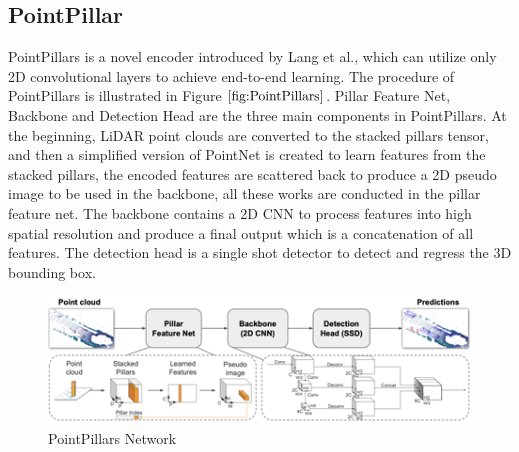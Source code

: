 \subsection{PointPillar}
PointPillars is a novel encoder introduced by Lang et al.\cite{lang_pointpillars_2019}, which can utilize only 2D convolutional layers to achieve end-to-end learning. The procedure of PointPillars is illustrated in Figure \(\ref{fig:PointPillars}\). Pillar Feature Net, Backbone and Detection Head are the three main components in PointPillars. At the beginning, LiDAR point clouds are converted to the stacked pillars tensor, and then a simplified version of PointNet\cite{qi_pointnet_2017} is created to learn features from the stacked pillars, the encoded features are scattered back to produce a 2D pseudo image to be used in the backbone, all these works are conducted in the pillar feature net. The backbone contains a 2D CNN to process features into high spatial resolution and produce a final output which is a concatenation of all features. The detection head is a single shot detector to detect and regress the 3D bounding box.
\begin{figure}[!htbp]
\centering
\includegraphics[scale=1]{Graphics/PointPillars.png}
\caption{PointPillars Network}
\label{fig:PointPillars}
\end{figure}
